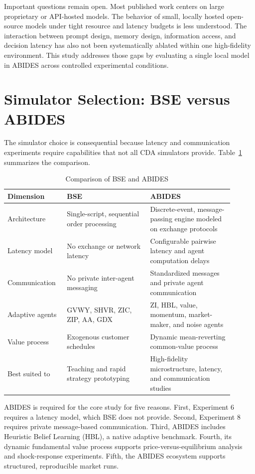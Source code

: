 \documentclass[11pt]{article}
\begin{document}
Important questions remain open. Most published work centers on large proprietary or API-hosted models. The behavior of small, locally hosted open-source models under tight resource and latency budgets is less understood. The interaction between prompt design, memory design, information access, and decision latency has also not been systematically ablated within one high-fidelity environment. This study addresses those gaps by evaluating a single local model in ABIDES across controlled experimental conditions.

\section{Simulator Selection: BSE versus ABIDES}

The simulator choice is consequential because latency and communication experiments require capabilities that not all CDA simulators provide. Table~\ref{tab:simulators} summarizes the comparison.

\begin{table}[H]
\centering
\caption{Comparison of BSE and ABIDES}
\label{tab:simulators}
\begin{tabular}{p{0.22\linewidth}p{0.34\linewidth}p{0.34\linewidth}}
\toprule
Dimension & BSE & ABIDES \\
\midrule
Architecture & Single-script, sequential order processing & Discrete-event, message-passing engine modeled on exchange protocols \\
Latency model & No exchange or network latency & Configurable pairwise latency and agent computation delays \\
Communication & No private inter-agent messaging & Standardized messages and private agent communication \\
Adaptive agents & GVWY, SHVR, ZIC, ZIP, AA, GDX & ZI, HBL, value, momentum, market-maker, and noise agents \\
Value process & Exogenous customer schedules & Dynamic mean-reverting common-value process \\
Best suited to & Teaching and rapid strategy prototyping & High-fidelity microstructure, latency, and communication studies \\
\bottomrule
\end{tabular}
\end{table}

ABIDES is required for the core study for five reasons. First, Experiment 6 requires a latency model, which BSE does not provide. Second, Experiment 8 requires private message-based communication. Third, ABIDES includes Heuristic Belief Learning (HBL), a native adaptive benchmark. Fourth, its dynamic fundamental value process supports price-versus-equilibrium analysis and shock-response experiments. Fifth, the ABIDES ecosystem supports structured, reproducible market runs.
\end{document}
